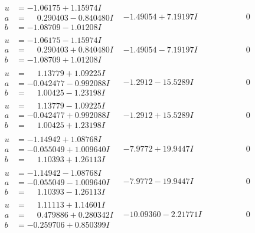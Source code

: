 \documentclass[1p]{elsarticle_modified}
\theoremstyle{definition}
\begin{document}
$$\begin{array}{c|c|c}
\begin{aligned}
u &= -1.06175 + 1.15974 I \\
a &= \phantom{-}0.290403 - 0.840480 I \\
b &= -1.08709 - 1.01208 I\end{aligned}
 & -1.49054 + 7.19197 I & \phantom{-0.000000 } 0 \\ \hline\begin{aligned}
u &= -1.06175 - 1.15974 I \\
a &= \phantom{-}0.290403 + 0.840480 I \\
b &= -1.08709 + 1.01208 I\end{aligned}
 & -1.49054 - 7.19197 I & \phantom{-0.000000 } 0 \\ \hline\begin{aligned}
u &= \phantom{-}1.13779 + 1.09225 I \\
a &= -0.042477 - 0.992088 I \\
b &= \phantom{-}1.00425 - 1.23198 I\end{aligned}
 & -1.2912 - 15.5289 I & \phantom{-0.000000 } 0 \\ \hline\begin{aligned}
u &= \phantom{-}1.13779 - 1.09225 I \\
a &= -0.042477 + 0.992088 I \\
b &= \phantom{-}1.00425 + 1.23198 I\end{aligned}
 & -1.2912 + 15.5289 I & \phantom{-0.000000 } 0 \\ \hline\begin{aligned}
u &= -1.14942 + 1.08768 I \\
a &= -0.055049 + 1.009640 I \\
b &= \phantom{-}1.10393 + 1.26113 I\end{aligned}
 & -7.9772 + 19.9447 I & \phantom{-0.000000 } 0 \\ \hline\begin{aligned}
u &= -1.14942 - 1.08768 I \\
a &= -0.055049 - 1.009640 I \\
b &= \phantom{-}1.10393 - 1.26113 I\end{aligned}
 & -7.9772 - 19.9447 I & \phantom{-0.000000 } 0 \\ \hline\begin{aligned}
u &= \phantom{-}1.11113 + 1.14601 I \\
a &= \phantom{-}0.479886 + 0.280342 I \\
b &= -0.259706 + 0.850399 I\end{aligned}
 & -10.09360 - 2.21771 I & \phantom{-0.000000 } 0\\

\end{array}$$
\end{document}
